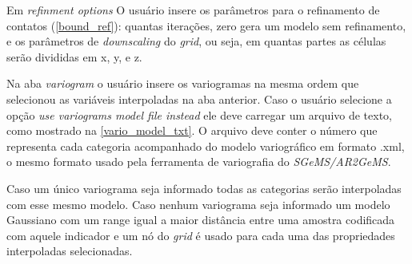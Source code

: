 Em \textit{refinment options} O usuário insere os parâmetros para o refinamento de contatos (\autoref{bound_ref}): quantas iterações, zero gera um modelo sem refinamento, e os parâmetros de \textit{downscaling} do \textit{grid}, ou seja, em quantas partes as células serão divididas em x, y, e z.

Na aba \textit{variogram} o usuário insere os variogramas na mesma ordem que selecionou as variáveis interpoladas na aba anterior. Caso o usuário selecione a opção \textit{use variograms model file instead} ele deve carregar um arquivo de texto, como mostrado na \autoref{vario_model_txt}. O arquivo deve conter o número que representa cada categoria acompanhado do modelo variográfico em formato .xml, o mesmo formato usado pela ferramenta de variografia do \textit{SGeMS/AR2GeMS}.

Caso um único variograma seja informado todas as categorias serão interpoladas com esse mesmo modelo. Caso nenhum variograma seja informado um modelo Gaussiano com um range igual a maior distância entre uma amostra codificada com aquele indicador e um nó do \textit{grid} é usado para cada uma das propriedades interpoladas selecionadas.

